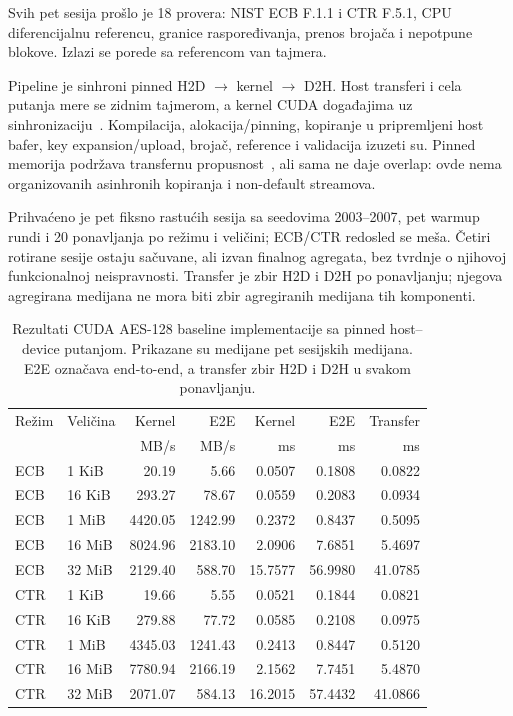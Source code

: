 Svih pet sesija prošlo je 18 provera: NIST ECB F.1.1 i CTR F.5.1,
CPU diferencijalnu referencu, granice raspoređivanja, prenos brojača i
nepotpune blokove. Izlazi se porede sa referencom van tajmera.

Pipeline je sinhroni pinned H2D $\rightarrow$ kernel $\rightarrow$ D2H.
Host transferi i cela putanja mere se zidnim tajmerom, a kernel CUDA
događajima uz sinhronizaciju~\cite{cupy-performance}. Kompilacija,
alokacija/pinning, kopiranje u pripremljeni host bafer, key expansion/upload,
brojač, reference i validacija izuzeti su. Pinned memorija podržava transfernu
propusnost~\cite{nvidia-cuda-best-practices}, ali sama ne daje overlap:
ovde nema organizovanih asinhronih kopiranja i non-default streamova.

Prihvaćeno je pet fiksno rastućih sesija sa seedovima 2003--2007, pet
warmup rundi i 20 ponavljanja po režimu i veličini; ECB/CTR redosled se
meša. Četiri rotirane sesije ostaju sačuvane, ali izvan finalnog agregata,
bez tvrdnje o njihovoj funkcionalnoj neispravnosti. Transfer je zbir H2D
i D2H po ponavljanju; njegova agregirana medijana ne mora biti zbir
agregiranih medijana tih komponenti.

\begin{table}[htbp]
\centering
\small
\setlength{\tabcolsep}{3pt}
\caption{Rezultati CUDA AES-128 baseline implementacije sa pinned
host--device putanjom. Prikazane su medijane pet sesijskih medijana.
E2E označava end-to-end, a transfer zbir H2D i D2H u svakom ponavljanju.}
\label{tab:cuda-baseline-results}
\begin{tabular}{llrrrrr}
\toprule
Režim & Veličina & Kernel & E2E & Kernel & E2E & Transfer \\
 & & MB/s & MB/s & ms & ms & ms \\
\midrule
ECB & 1 KiB & 20.19 & 5.66 & 0.0507 & 0.1808 & 0.0822 \\
ECB & 16 KiB & 293.27 & 78.67 & 0.0559 & 0.2083 & 0.0934 \\
ECB & 1 MiB & 4420.05 & 1242.99 & 0.2372 & 0.8437 & 0.5095 \\
ECB & 16 MiB & 8024.96 & 2183.10 & 2.0906 & 7.6851 & 5.4697 \\
ECB & 32 MiB & 2129.40 & 588.70 & 15.7577 & 56.9980 & 41.0785 \\
\midrule
CTR & 1 KiB & 19.66 & 5.55 & 0.0521 & 0.1844 & 0.0821 \\
CTR & 16 KiB & 279.88 & 77.72 & 0.0585 & 0.2108 & 0.0975 \\
CTR & 1 MiB & 4345.03 & 1241.43 & 0.2413 & 0.8447 & 0.5120 \\
CTR & 16 MiB & 7780.94 & 2166.19 & 2.1562 & 7.7451 & 5.4870 \\
CTR & 32 MiB & 2071.07 & 584.13 & 16.2015 & 57.4432 & 41.0866 \\
\bottomrule
\end{tabular}
\end{table}


